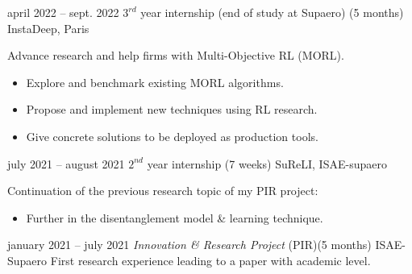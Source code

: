 \documentclass[
	a4paper,
]{fortysecondscv}
\begin{document}
\makefrontsidebar
{}

\begin{cvtable}[4]
	\cvitem
    	{april 2022 -- sept. 2022}
    	{$3^{rd}$ year internship (end of study at Supaero) \newline (5 months)}
    	{InstaDeep, Paris}
    	{
    	    Advance research and help firms with Multi-Objective RL (MORL).
        	\begin{itemize}
        	    \item Explore and benchmark existing MORL algorithms.
        	    \item Propose and implement new techniques using RL research.
        	    \item Give concrete solutions to be deployed as production tools.
        	\end{itemize}
        	   
    	}
	\cvitem
    	{july 2021 -- august 2021}
    	{$2^{nd}$ year internship \newline (7 weeks)}
    	{SuReLI, ISAE-supaero}
    	{
        	Continuation of the previous research topic of my PIR project:
        	\begin{itemize}
        	    \item Further in the disentanglement model \& learning technique.
        	\end{itemize}
        	  \newline
        	  
    	}
	\cvitem
    	{january 2021 -- july 2021}
    	{\textit{Innovation \& Research Project} (PIR)\newline (5 months)}
    	{ISAE-Supaero}
    	{
    	    First research experience leading to a paper with academic level.\newline
}
\end{cvtable}
\end{document}
